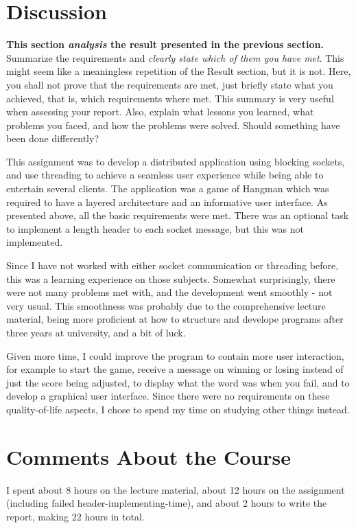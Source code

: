 \documentclass[a4paper]{scrartcl}
\begin{document}
\pagebreak

\section{Discussion}

\textbf{This section \textit{analysis} the result presented in the previous section.} \\

\noindent Summarize the requirements and \textit{clearly state which of them you have met}. This might seem like a meaningless repetition of the Result section, but it is not. Here, you shall not prove that the requirements are met, just briefly state what you achieved, that is, which requirements where met. This summary is very useful when assessing your report. Also, explain what lessons you learned, what problems you faced, and how the problems were solved. Should something have been done differently?

This assignment was to develop a distributed application using blocking sockets, and use threading to achieve a seamless user experience while being able to entertain several clients. The application was a game of Hangman which was required to have a layered architecture and an informative user interface. As presented above, all the basic requirements were met. There was an optional task to implement a length header to each socket message, but this was not implemented.

Since I have not worked with either socket communication or threading before, this was a learning experience on those subjects. Somewhat surprisingly, there were not many problems met with, and the development went smoothly - not very usual. This smoothness was probably due to the comprehensive lecture material, being more proficient at how to structure and develope programs after three years at university, and a bit of luck.

Given more time, I could improve the program to contain more user interaction, for example to start the game, receive a message on winning or losing instead of just the score being adjusted, to display what the word was when you fail, and to develop a graphical user interface. Since there were no requirements on these quality-of-life aspects, I chose to spend my time on studying other things instead.

\section{Comments About the Course}

I spent about 8 hours on the lecture material, about 12 hours on the assignment (including failed header-implementing-time), and about 2 hours to write the report, making 22 hours in total.
\end{document}
